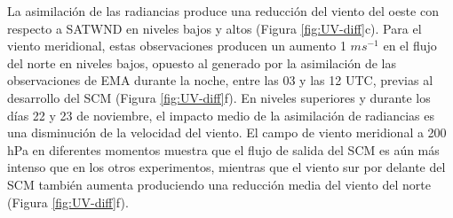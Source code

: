\documentclass[12pt,oneside,a4paper]{reedthesis}
\begin{document}
La asimilación de las radiancias produce una reducción del viento del oeste con respecto a SATWND en niveles bajos y altos (Figura \ref{fig:UV-diff}c). Para el viento meridional, estas observaciones producen un aumento 1 \(ms^{-1}\) en el flujo del norte en niveles bajos, opuesto al generado por la asimilación de las observaciones de EMA durante la noche, entre las 03 y las 12 UTC, previas al desarrollo del SCM (Figura \ref{fig:UV-diff}f). En niveles superiores y durante los días 22 y 23 de noviembre, el impacto medio de la asimilación de radiancias es una disminución de la velocidad del viento. El campo de viento meridional a 200 hPa en diferentes momentos muestra que el flujo de salida del SCM es aún más intenso que en los otros experimentos, mientras que el viento sur por delante del SCM también aumenta produciendo una reducción media del viento del norte (Figura \ref{fig:UV-diff}f).
\end{document}
